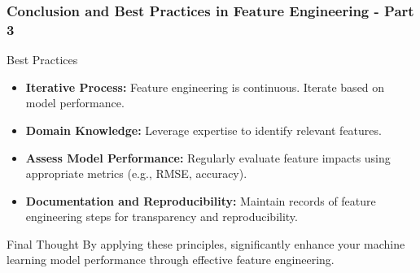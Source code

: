 \documentclass[aspectratio=169]{beamer}
\begin{document}
\begin{frame}[fragile]
  \frametitle{Conclusion and Best Practices in Feature Engineering - Part 3}
  
  \begin{block}{Best Practices}
    \begin{itemize}
      \item \textbf{Iterative Process:} Feature engineering is continuous. Iterate based on model performance.
      \item \textbf{Domain Knowledge:} Leverage expertise to identify relevant features.
      \item \textbf{Assess Model Performance:} Regularly evaluate feature impacts using appropriate metrics (e.g., RMSE, accuracy).
      \item \textbf{Documentation and Reproducibility:} Maintain records of feature engineering steps for transparency and reproducibility.
    \end{itemize}
  \end{block}
  
  \begin{block}{Final Thought}
    By applying these principles, significantly enhance your machine learning model performance through effective feature engineering.
  \end{block}
\end{frame}
\end{document}
